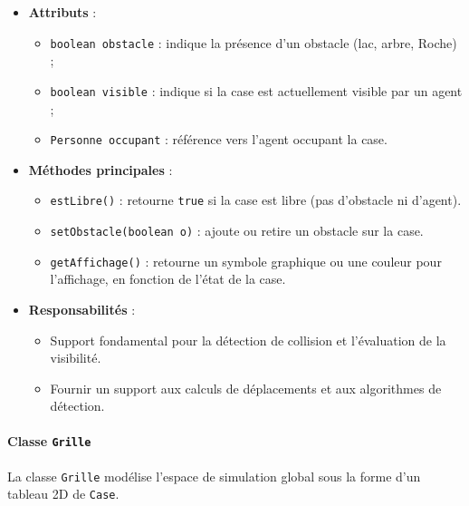 \begin{itemize}
    \item \textbf{Attributs} :
    \begin{itemize}
        \item \texttt{boolean obstacle} : indique la présence d’un obstacle (lac, arbre, Roche) ;
        \item \texttt{boolean visible} : indique si la case est actuellement visible par un agent ;
        
        \item \texttt{Personne occupant} : référence vers l’agent occupant la case.
    \end{itemize}
    \item \textbf{Méthodes principales} :
    \begin{itemize}
        \item \texttt{estLibre()} : retourne \texttt{true} si la case est libre (pas d’obstacle ni d’agent).
        \item \texttt{setObstacle(boolean o)} : ajoute ou retire un obstacle sur la case.
        \item \texttt{getAffichage()} : retourne un symbole graphique ou une couleur pour l’affichage, en fonction de l’état de la case.
    \end{itemize}
    \item \textbf{Responsabilités} :
    \begin{itemize}
        \item Support fondamental pour la détection de collision et l’évaluation de la visibilité.
        \item Fournir un support aux calculs de déplacements et aux algorithmes de détection.
    \end{itemize}
\end{itemize}

\vspace{1em}

\paragraph{Classe \texttt{Grille}}

La classe \texttt{Grille} modélise l’espace de simulation global sous la forme d’un tableau 2D de \texttt{Case}.

